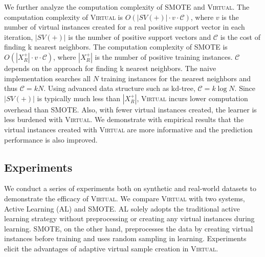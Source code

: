 We further analyze the computation complexity of SMOTE and \textsc{Virtual}.  The computation complexity of \textsc{Virtual} is $O(\left|SV(+) \right|\cdot v \cdot \mathcal{C})$, where $v$ is the number of virtual instances created for a real positive support vector in each iteration, $\left|SV(+) \right|$ is the number of positive support vectors and $\mathcal{C}$ is the cost of finding k nearest neighbors. The computation complexity of SMOTE is $O(\left| X_R^+\right| \cdot v \cdot \mathcal{C})$, where $\left| X_R^+\right|$ is the number of positive training instances. $\mathcal{C}$ depends on the approach for finding k nearest neighbors. The naive implementation searches all $N$ training instances for the nearest neighbors and thus $\mathcal{C}=kN$. Using advanced data structure such as kd-tree, $\mathcal{C}=k\log N$. Since $\left|SV(+) \right|$ is typically much less than $\left| X_R^+\right|$, \textsc{Virtual} incurs lower computation overhead than SMOTE. Also, with fewer virtual instances created, the learner is less burdened with \textsc{Virtual}. We demonstrate with empirical results that the virtual instances created with \textsc{Virtual} are more informative and the prediction performance is also improved.

\subsection{Experiments}
We conduct a series of experiments both on synthetic and real-world datasets to demonstrate the efficacy of \textsc{Virtual}. We compare \textsc{Virtual} with two systems, Active Learning (AL) and SMOTE. AL solely adopts the traditional active learning strategy without preprocessing or creating any virtual instances during learning. SMOTE, on the other hand, preprocesses the data by creating virtual instances before training and uses random sampling in learning. Experiments elicit the advantages of adaptive virtual sample creation in \textsc{Virtual}.

